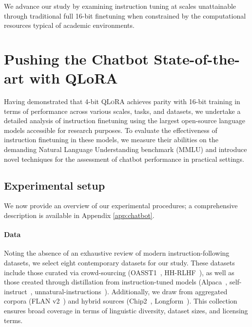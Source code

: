 We advance our study by examining instruction tuning at scales unattainable through traditional full 16-bit finetuning when constrained by the computational resources typical of academic environments.

\section{Pushing the Chatbot State-of-the-art with QLoRA}
\label{sec:pushing}
Having demonstrated that 4-bit \textsc{QLoRA} achieves parity with 16-bit training in terms of performance across various scales, tasks, and datasets, we undertake a detailed analysis of instruction finetuning using the largest open-source language models accessible for research purposes. To evaluate the effectiveness of instruction finetuning in these models, we measure their abilities on the demanding Natural Language Understanding benchmark (MMLU) and introduce novel techniques for the assessment of chatbot performance in practical settings.

\subsection{Experimental setup} We now provide an overview of our experimental procedures; a comprehensive description is available in Appendix \ref{app:chatbot}.

\paragraph{Data} Noting the absence of an exhaustive review of modern instruction-following datasets, we select eight contemporary datasets for our study. These datasets include those curated via crowd-sourcing (OASST1~\citep{kopf2023openassistant}, HH-RLHF~\citep{bai2022training}), as well as those created through distillation from instruction-tuned models (Alpaca~\citep{alpaca}, self-instruct~\citep{wang2022self}, unnatural-instructions~\citep{honovich2022unnatural}). Additionally, we draw from aggregated corpora (FLAN v2~\citep{chung2022scaling}) and hybrid sources (Chip2~\citep{laion2023}, Longform~\citep{koksal2023longform}). This collection ensures broad coverage in terms of linguistic diversity, dataset sizes, and licensing terms.

